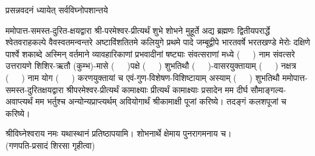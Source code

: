 
\setlength{\parindent}{0pt}


 

{प्रसन्नवदनं ध्यायेत् सर्वविघ्नोपशान्तये}
 

ममोपात्त-समस्त-दुरित-क्षयद्वारा श्री-परमेश्वर-प्रीत्यर्थं शुभे शोभने मुहूर्ते अद्य ब्रह्मणः
द्वितीयपरार्द्धे श्वेतवराहकल्पे वैवस्वतमन्वन्तरे अष्टाविंशतितमे कलियुगे प्रथमे पादे
जम्बूद्वीपे भारतवर्षे भरतखण्डे मेरोः दक्षिणे पार्श्वे शकाब्दे अस्मिन् वर्तमाने व्यावहारिकाणां
प्रभवादीनां षष्ट्याः संवत्सराणां मध्ये \mbox{(~~~)} नाम संवत्सरे उत्तरायणे 
शिशिर-ऋतौ (कुम्भ)-मासे \mbox{(~~~)}पक्षे \mbox{(~~~)} शुभतिथौ \mbox{(~~~)}-वासरयुक्तायाम्
\mbox{(~~~)} नक्षत्र \mbox{(~~~)} नाम योग  \mbox{(~~~)} करण\-युक्तायां च एवं-गुण-विशेषण-विशिष्टायाम्
अस्याम् \mbox{(~~~)} शुभतिथौ 
ममोपात्त-समस्त-दुरितक्षयद्वारा श्रीपरमेश्वर-प्रीत्यर्थं कामाक्ष्याः प्रीत्यर्थं कामाक्ष्याः प्रसादेन मम दीर्घ सौमाङ्गल्य-अवाप्त्यर्थं मम भर्तुश्च अन्योन्यप्राप्त्यर्थम् अवियोगार्थं श्रीकामाक्षी पूजां करिष्ये।
तदङ्गं कलशपूजां च करिष्ये। 


श्रीविघ्नेश्वराय नमः यथास्थानं प्रतिष्ठापयामि। शोभनार्थे क्षेमाय पुनरागमनाय च।\\
(गणपति-प्रसादं शिरसा गृहीत्वा)













